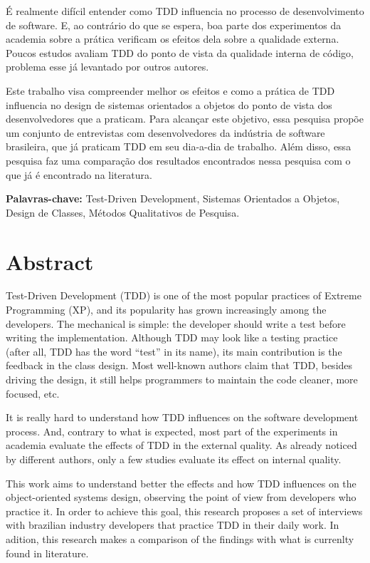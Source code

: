 \documentclass[11pt,twoside,a4paper]{book}
\begin{document}
É realmente difícil entender como TDD influencia no processo de desenvolvimento
de software. E, ao contrário do que se espera, boa parte dos experimentos da
academia sobre a prática verificam os efeitos dela sobre a qualidade externa. 
Poucos estudos avaliam TDD do ponto de vista da qualidade interna de código,
problema esse já levantado por outros autores.

Este trabalho visa compreender melhor os efeitos e como a prática de TDD
influencia no design de sistemas orientados a objetos do ponto de vista dos
desenvolvedores que a praticam. Para alcançar este objetivo, essa pesquisa
propõe um conjunto de entrevistas com desenvolvedores da indústria de software 
brasileira, que já praticam TDD em seu dia-a-dia de trabalho. Além disso, essa
pesquisa faz uma comparação dos resultados encontrados nessa pesquisa com o que
já é encontrado na literatura.

\noindent \textbf{Palavras-chave:} Test-Driven Development, Sistemas Orientados
a Objetos, Design de Classes, Métodos Qualitativos de Pesquisa.

\chapter*{Abstract}

Test-Driven Development (TDD) is one of the most popular practices of Extreme
Programming (XP), and its popularity has grown increasingly among the
developers. The mechanical is simple: the developer should write a test before
writing the implementation. Although TDD may look like a testing practice
(after all, TDD has the word ``test'' in its name), its main contribution is the
feedback in the class design. Most well-known authors claim that TDD, besides
driving the design, it still helps programmers to maintain the code cleaner,
more focused, etc.

It is really hard to understand how TDD influences on the software development
process. And, contrary to what is expected, most part of the experiments in
academia evaluate the effects of TDD in the external quality. As already noticed
by different authors, only a few studies evaluate its effect on internal
quality.

This work aims to understand better the effects and how TDD influences on the
object-oriented systems design, observing the point of view from developers who
practice it. In order to achieve this goal, this research proposes a set of
interviews with brazilian industry developers that practice TDD in their daily
work. In adition, this research makes a comparison of the findings with what is
currenlty found in literature.
\end{document}
